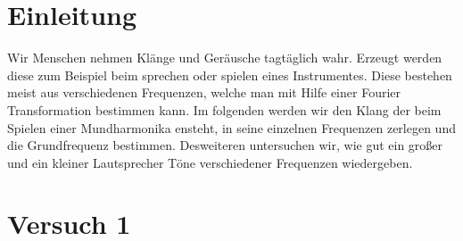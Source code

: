 \documentclass[12pt, oneside, a4paper, \docLanguage]{report}
\begin{document}

\setcounter{section}{0}



\clearpage

%
%


%
%


%
%
%

%
%




\setcounter{page}{1}
\pagestyle{default}
%
%
\chapter{Einleitung}
\label{chap:EINL}
\begin{normalsize}
Wir Menschen nehmen Klänge und Geräusche tagtäglich wahr. Erzeugt werden diese zum Beispiel beim sprechen oder spielen eines Instrumentes.
Diese bestehen meist aus verschiedenen Frequenzen, welche man mit Hilfe einer Fourier Transformation bestimmen kann. Im folgenden werden wir den Klang der beim Spielen einer Mundharmonika ensteht, in seine einzelnen Frequenzen zerlegen und die Grundfrequenz bestimmen. Desweiteren untersuchen wir, wie gut ein großer und ein kleiner Lautsprecher Töne verschiedener Frequenzen wiedergeben.
\end{normalsize}

%
%
\chapter{Versuch 1}
\label{chap:VERSUCH_1}
\end{document}

